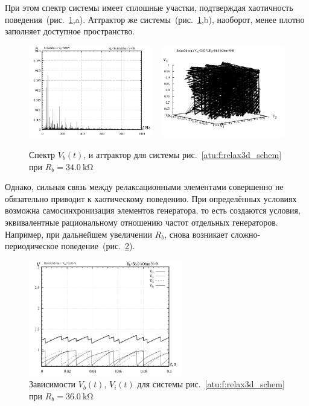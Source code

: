 При этом спектр системы имеет сплошные участки, подтверждая
хаотичность поведения~(рис.~\ref{atu:f:relax3d_f_08},a).
Аттрактор же системы~(рис.~\ref{atu:f:relax3d_f_08},b),
наоборот, менее плотно заполняет доступное пространство.

\begin{figure}[htb!]
  \centerline{
    \includegraphics[width=0.48\textwidth]{p/relax3d_f_08.png}
    ~
    \includegraphics[width=0.48\textwidth]{p/relax3d_v1v2v3_08.png}
  }
  \caption{Спектр $V_b(t)$, и аттрактор для системы рис.~\ref{atu:f:relax3d_schem} при $R_b=\SI{34.0}{\kilo\ohm}$ }
  \label{atu:f:relax3d_f_08}
\end{figure}

Однако, сильная связь между релаксационными элементами
совершенно не обязательно приводит к хаотическому поведению.
При определённых условиях возможна самосинхронизация
элементов генератора, то есть создаются условия,
эквивалентные рациональному отношению частот отдельных генераторов.
Например, при дальнейшем увеличении $R_b$, снова
возникает сложно-периодическое поведение~(рис.~\ref{atu:f:relax3d_t_09}).

\begin{figure}[htb!]
  \centerline{\includegraphics[width=0.6\textwidth]{p/relax3d_t_09.png} }
  \caption{Зависимости $V_b(t)$, $V_i(t)$ для системы рис.~\ref{atu:f:relax3d_schem} при $R_b=\SI{36.0}{\kilo\ohm}$ }
  \label{atu:f:relax3d_t_09}
\end{figure}


